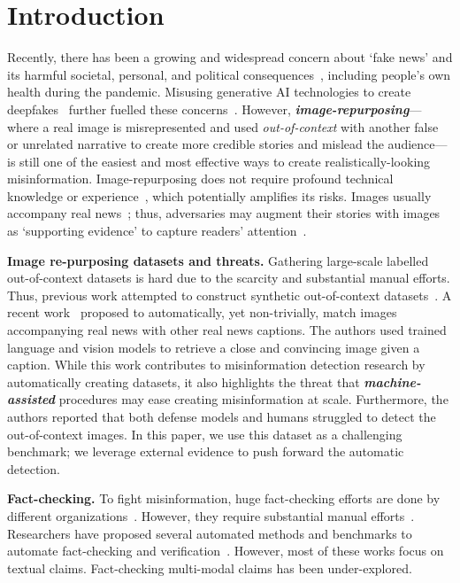 \section{Introduction}

Recently, there has been a growing and widespread concern about `fake news' and its harmful societal, personal, and political consequences~\cite{agarwal2019protecting,huh2018fighting,lazer2018science}, including people's own health during the pandemic\cite{nightingale2020examining,press_bbc_covid,press_bbc_covid2}. Misusing generative AI technologies  
to create deepfakes~\cite{goodfellow2014generative,karras2020analyzing,radford2019language} further fuelled these concerns~\cite{press1,press2}. 
However, \textbf{\textit{image-repurposing}}--- where a real image is misrepresented and used \textit{out-of-context} with another false or unrelated narrative to create more credible stories and mislead the audience---is still one of the easiest and most effective ways to create realistically-looking misinformation. Image-repurposing does not require profound technical knowledge or experience~\cite{luo2021newsclippings,aneja2021catching}, which potentially amplifies its risks. Images usually accompany real news~\cite{tan2020detecting}; thus, adversaries may augment their stories with images as `supporting evidence' to capture readers' attention~\cite{luo2021newsclippings,hameleers2020picture,wang2021understanding}.

\textbf{Image re-purposing datasets and threats.} Gathering large-scale labelled out-of-context datasets is hard due to the scarcity and substantial manual efforts. Thus, previous work attempted to construct synthetic out-of-context datasets~\cite{jaiswal2017multimedia,sabir2018deep}.  
A recent work~\cite{luo2021newsclippings} proposed to automatically, yet non-trivially, match images accompanying real news with other real news captions. The authors used trained language and vision models to retrieve a close and convincing image given a caption. While this work contributes to misinformation detection research by automatically creating datasets, it also highlights the threat that \textbf{\textit{machine-assisted}} procedures may ease creating misinformation at scale. Furthermore, the authors reported that both defense models and humans struggled to detect the out-of-context images. 
In this paper, we use this dataset as a challenging benchmark; we leverage external evidence to push forward the automatic detection. 

\textbf{Fact-checking.} To fight misinformation, huge fact-checking efforts are done by different organizations~\cite{fc1,fc2}. However, they require substantial manual efforts~\cite{press_vice}. Researchers have proposed several automated methods and benchmarks to automate fact-checking and verification~\cite{thorne2018fever,popat2018declare}. However, most of these works focus on textual claims. Fact-checking multi-modal claims has been under-explored.

